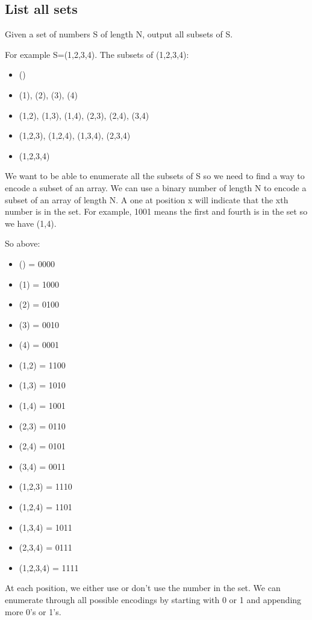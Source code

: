 \documentclass[11pt,oneside]{book}
\begin{document}
\subsection{List all sets}

Given a set of numbers S of length N, output all subsets of S.

For example S=(1,2,3,4). The subsets of (1,2,3,4):

\begin{itemize}
\item ()
\item (1), (2), (3), (4)
\item (1,2), (1,3), (1,4), (2,3), (2,4), (3,4)
\item (1,2,3), (1,2,4), (1,3,4), (2,3,4)
\item (1,2,3,4)
\end{itemize}

We want to be able to enumerate all the subsets of S so we need to find a way to encode a subset of an array. We can use a binary number of length N to encode a subset of an array of length N. A one at position x will indicate that the xth number is in the set. For example, 1001 means the first and fourth is in the set so we have (1,4).

So above:

\begin{itemize}
\item () = 0000
\item (1) = 1000
\item (2) = 0100
\item (3) = 0010
\item (4) = 0001
\item (1,2) = 1100
\item (1,3) = 1010
\item (1,4) = 1001
\item (2,3) = 0110
\item (2,4) = 0101
\item (3,4) = 0011
\item (1,2,3) = 1110
\item (1,2,4) = 1101
\item (1,3,4) = 1011
\item (2,3,4) = 0111
\item (1,2,3,4) = 1111
\end{itemize}

At each position, we either use or don't use the number in the set. We can enumerate through all possible encodings by starting with 0 or 1 and appending more 0's or 1's.
\end{document}
